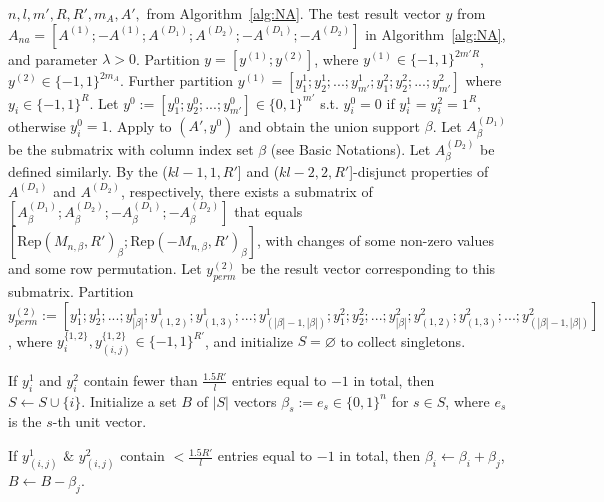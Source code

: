 \documentclass{article}
\begin{document}
\begin{algorithm}
\caption{Non-adaptive scheme of the MLC under Assumption~\ref{Assumption1}: Decoding algorithm}\label{alg:NAdec}
\begin{algorithmic}[1]
    \Require $n,l,m',R,R',m_A,A',$ from Algorithm~\ref{alg:NA}. The test result vector $y$ from $A_{na}=[A^{(1)};-A^{(1)};A^{(D_1)};A^{(D_2)};-A^{(D_1)};-A^{(D_2)}]$ in Algorithm~\ref{alg:NA}, and parameter $\lambda>0$.   
    \State Partition $y=[y^{(1)};y^{(2)}]$, where $y^{(1)}\in\{-1,1\}^{2m'R}$,  $y^{(2)}\in\{-1,1\}^{2m_A}$. Further partition $y^{(1)}=[y_1^1;y_2^1;...;y_{m'}^1;y_1^2;y_2^2;...;y_{m'}^2]$ where $y_i\in \{-1,1\}^R$. Let $y^0:=[y_1^0;y_2^0;...;y_{m'}^0]\in\{0,1\}^{m'}$ s.t. $y_i^0=0$ if $y_i^1=y_i^2=1^R$, otherwise $y_i^0=1$. 
    \State Apply \cite[Algorithm~3]{li2025support} to $(A',y^0)$ and obtain the union support $\beta$. Let $A^{(D_1)}_\beta$ be the submatrix with column index set $\beta$ (see Basic Notations). Let $A^{(D_2)}_\beta$ be defined similarly. 
    \State By the ($kl-1,1,R'$] and ($kl-2,2,R'$]-disjunct properties of $A^{(D_1)}$ and $A^{(D_2)}$, respectively, there exists a submatrix of $[A^{(D_1)}_\beta;A^{(D_2)}_\beta;-A^{(D_1)}_\beta;-A^{(D_2)}_\beta]$ that equals $[\mathrm{Rep}(M_{n,\beta},R')_\beta;\mathrm{Rep}(-M_{n,\beta},R')_\beta]$, with changes of some non-zero values and some row permutation. Let $y^{(2)}_{perm}$ be the result vector corresponding to this submatrix. Partition $y^{(2)}_{perm}:=[y_1^1;y_2^1;...;y_{|\beta|}^1;y_{(1,2)}^1;y_{(1,3)}^1;...;y_{(|\beta|-1,|\beta|)}^1;y_1^2;y_2^2;...;y_{|\beta|}^2;y_{(1,2)}^2;y_{(1,3)}^2;...;y_{(|\beta|-1,|\beta|)}^2]$, where $y_i^{\{1,2\}},y_{(i,j)}^{\{1,2\}}\in \{-1,1\}^{R'}$, and initialize $S=\varnothing$ to collect singletons. 
    \begin{scriptsize}
    \end{scriptsize}
    \State If $y_i^1$ and $y_i^2$ contain fewer than $\frac{1.5R'}{l}$ entries equal to $-1$ in total, then $S\leftarrow S\cup\{i\}$.
    \EndFor
    \State Initialize a set $B$ of $|S|$ vectors $\beta_s:=e_s\in\{0,1\}^n$ for $s\in S$, where $e_s$ is the $s$-th unit vector. 
    \begin{scriptsize}
    \end{scriptsize}
    \State If $y_{(i,j)}^1$ $\&$ $y_{(i,j)}^2$ contain $<\frac{1.5R'}{l}$ entries equal to $-1$ in total, then $\beta_i\leftarrow\beta_i+\beta_j$, $B\leftarrow B-\beta_j$. 

\end{algorithmic}
\end{algorithm}
\end{document}
